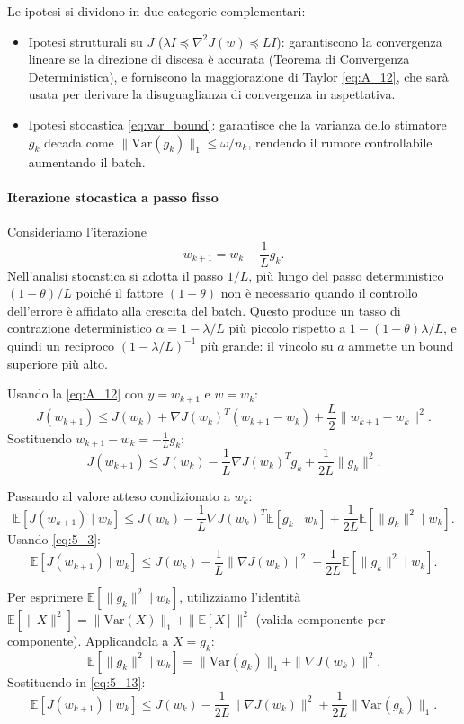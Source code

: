 \documentclass[a4paper,12pt]{article}
\numberwithin{equation}{section}
\numberwithin{figure}{section}
\numberwithin{table}{section}
\begin{document}
Le ipotesi si dividono in due categorie complementari:
\begin{itemize}
    \item Ipotesi strutturali su \(J\) (\(\lambda I \preceq \nabla^2 J(w) \preceq LI\)): garantiscono la convergenza lineare se la direzione di discesa è accurata (Teorema di Convergenza Deterministica), e forniscono la maggiorazione di Taylor \eqref{eq:A_12}, che sarà usata per derivare la disuguaglianza di convergenza in aspettativa.
    \item Ipotesi stocastica \eqref{eq:var_bound}: garantisce che la varianza dello stimatore \(g_k\) decada come \(\|\mathrm{Var}(g_k)\|_1 \le \omega/n_k\), rendendo il rumore controllabile aumentando il batch.
\end{itemize}

\paragraph{Iterazione stocastica a passo fisso}

Consideriamo l'iterazione
\[
w_{k+1} = w_k - \frac{1}{L} g_k. \tag{5.10}\label{eq:5_10}
\]
Nell'analisi stocastica si adotta il passo $1/L$, più lungo del passo deterministico $(1-\theta)/L$ poiché il fattore $(1-\theta)$ non è necessario quando il controllo dell'errore è affidato alla crescita del batch. Questo produce un tasso di contrazione deterministico $\alpha = 1-\lambda/L$ più piccolo rispetto a $1-(1-\theta)\lambda/L$, e quindi un reciproco $(1-\lambda/L)^{-1}$ più grande: il vincolo su $a$ ammette un bound superiore più alto.

Usando la \eqref{eq:A_12} con \(y = w_{k+1}\) e \(w = w_k\):
\[
J(w_{k+1}) \le J(w_k) + \nabla J(w_k)^T (w_{k+1} - w_k) + \frac{L}{2}\|w_{k+1} - w_k\|^2. \tag{5.11}\label{eq:5_11}
\]
Sostituendo \(w_{k+1} - w_k = -\frac{1}{L}g_k\):
\[
J(w_{k+1}) \le J(w_k) - \frac{1}{L}\nabla J(w_k)^T g_k + \frac{1}{2L}\|g_k\|^2. \tag{5.12}\label{eq:5_12}
\]

Passando al valore atteso condizionato a \(w_k\):
\[
\mathbb{E}[J(w_{k+1}) \mid w_k] \le J(w_k) - \frac{1}{L}\nabla J(w_k)^T \mathbb{E}[g_k \mid w_k] + \frac{1}{2L}\mathbb{E}[\|g_k\|^2 \mid w_k].
\]
Usando \eqref{eq:5_3}:
\[
\mathbb{E}[J(w_{k+1}) \mid w_k] \le J(w_k) - \frac{1}{L}\|\nabla J(w_k)\|^2 + \frac{1}{2L}\mathbb{E}[\|g_k\|^2 \mid w_k]. \tag{5.13}\label{eq:5_13}
\]

Per esprimere \(\mathbb{E}[\|g_k\|^2 \mid w_k]\), utilizziamo l'identità \(\mathbb{E}[\|X\|^2] = \|\mathrm{Var}(X)\|_1 + \|\mathbb{E}[X]\|^2\) (valida componente per componente). Applicandola a \(X = g_k\):
\[
\mathbb{E}[\|g_k\|^2 \mid w_k] = \|\mathrm{Var}(g_k)\|_1 + \|\nabla J(w_k)\|^2. \tag{5.14}\label{eq:5_14}
\]
Sostituendo in \eqref{eq:5_13}:
\[
\mathbb{E}[J(w_{k+1}) \mid w_k] \le J(w_k) - \frac{1}{2L}\|\nabla J(w_k)\|^2 + \frac{1}{2L}\|\mathrm{Var}(g_k)\|_1. \tag{5.15}\label{eq:5_15}
\]
\end{document}
